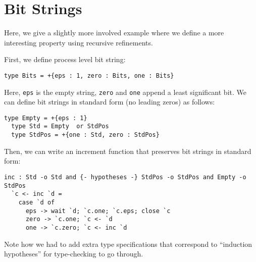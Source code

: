 \documentclass[a4paper,USenglish]{lipics-v2016}
\begin{document}


\section{Bit Strings}
\label{optional-example}

Here, we give a slightly more involved example where we define a more interesting property using recursive refinements.

First, we define process level bit string:
\begin{lstlisting}[language=krill, style=custom]
  type Bits = +{eps : 1, zero : Bits, one : Bits}
\end{lstlisting}
Here, \texttt{eps} is the empty string, \texttt{zero} and \texttt{one} append a least significant bit. We can define bit strings in standard form (no leading zeros) as follows:
\begin{lstlisting}[language=krill, style=custom]
  type Empty = +{eps : 1}
  type Std = Empty  or StdPos
  type StdPos = +{one : Std, zero : StdPos}
\end{lstlisting}

Then, we can write an increment function that preserves bit strings in standard form:
\begin{lstlisting}[language=krill, style=custom]
  inc : Std -o Std and {- hypotheses -} StdPos -o StdPos and Empty -o StdPos
  `c <- inc `d =
    case `d of
      eps -> wait `d; `c.one; `c.eps; close `c
      zero -> `c.one; `c <- `d
      one -> `c.zero; `c <- inc `d
\end{lstlisting}

Note how we had to add extra type specifications that correspond to ``induction hypotheses'' for type-checking to go through.
\end{document}

